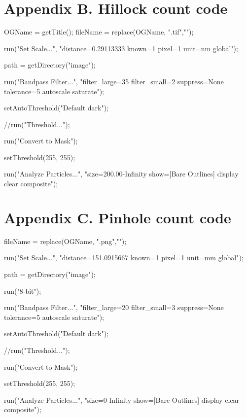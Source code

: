 \documentclass{article}
\begin{document}

\setcounter{equation}{0}

\section*{Appendix B. Hillock count code}

\begin{center}
\begin{boxedverbatim}
    OGName = getTitle();
fileName = replace(OGName, ".tif","");

run("Set Scale...", "distance=0.29113333 known=1 
pixel=1 unit=nm global"); 

path = getDirectory("image");

run("Bandpass Filter...", "filter_large=35 
filter_small=2 suppress=None tolerance=5 
autoscale saturate");

setAutoThreshold("Default dark");

//run("Threshold...");

run("Convert to Mask");

setThreshold(255, 255);

run("Analyze Particles...", "size=200.00-Infinity 
show=[Bare Outlines] 
display clear composite");

\end{boxedverbatim}
\end{center}
\setcounter{equation}{0}

\section*{Appendix C. Pinhole count code}

\begin{center}
\begin{boxedverbatim}
fileName = replace(OGName, ".png","");

run("Set Scale...", "distance=151.0915667 
known=1 pixel=1 unit=mm global"); 

path = getDirectory("image");

run("8-bit");

run("Bandpass Filter...", "filter_large=20 
filter_small=3 suppress=None tolerance=5 
autoscale saturate");

setAutoThreshold("Default dark");

//run("Threshold...");

run("Convert to Mask");

setThreshold(255, 255);

run("Analyze Particles...", "size=0-Infinity 
show=[Bare Outlines] display clear composite");
\end{boxedverbatim}
\end{center}
\end{document}
